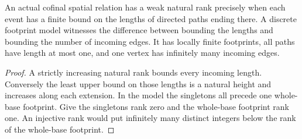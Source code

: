 \begin{proposition}
\label{hir:g8-weak-rank-bounded-directed-height}
\leanok
An actual cofinal spatial relation has a weak natural rank precisely
when each event has a finite bound on the lengths of directed paths
ending there. A discrete footprint model witnesses the difference
between bounding the lengths and bounding the number of incoming
edges. It has locally finite footprints, all paths have length at
most one, and one vertex has infinitely many incoming edges.
\end{proposition}
\begin{proof}
A strictly increasing natural rank bounds every incoming length.
Conversely the least upper bound on those lengths is a natural
height and increases along each extension. In the model the
singletons all precede one whole-base footprint. Give the
singletons rank zero and the whole-base footprint rank one.
An injective rank would put infinitely many distinct integers
below the rank of the whole-base footprint.
\end{proof}

